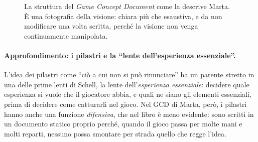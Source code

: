 \begin{figure}[htbp]
\centering
{}
\caption{La struttura del \emph{Game Concept Document} come la descrive Marta. È una
fotografia della visione: chiara più che esaustiva, e da non modificare una volta
scritta, perché la visione non venga continuamente manipolata.}
\label{a13:fig:gcd}
\end{figure}

\paragraph{Approfondimento: i pilastri e la ``lente dell'esperienza essenziale''.} L'idea
dei pilastri come ``ciò a cui non si può rinunciare'' ha un parente stretto in una delle prime
lenti di Schell, la lente dell'\emph{esperienza essenziale}: decidere quale esperienza si
vuole che il giocatore abbia, e quali ne siano gli elementi essenziali, prima di decidere
come catturarli nel gioco. Nel GCD di Marta, però, i pilastri hanno anche una funzione
\emph{difensiva}, che nel libro è meno evidente: sono scritti in un documento statico
proprio perché, quando il gioco passa per molte mani e molti reparti, nessuno possa
smontare per strada quello che regge l'idea.

